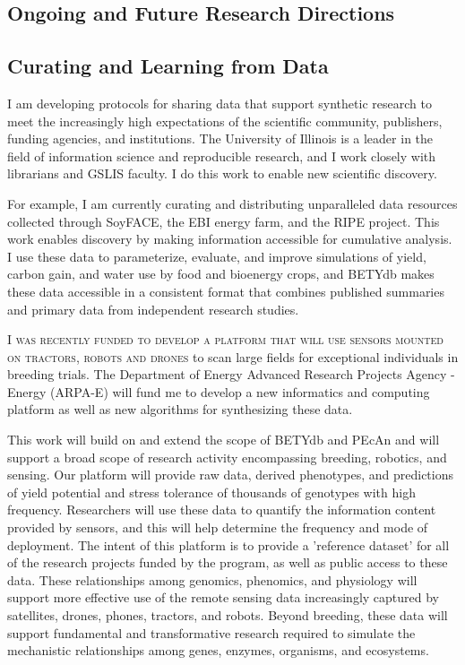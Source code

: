 \documentclass[english]{tufte-handout}
\providecommand\mynewthought[1]{%
   \addvspace{0.5em}%
   \noindent\hspace{-0.5em}\textsc{#1} %
}
\begin{document}
\begin{fullwidth}
\section{Ongoing and Future Research Directions}


\subsection{Curating and Learning from Data} 

 I am developing protocols for sharing data that support synthetic research to meet the increasingly high expectations of the scientific community, publishers, funding agencies, and institutions.
 The University of Illinois is a leader in the field of information science and reproducible research, and I work closely with librarians and GSLIS faculty.
 I do this work to enable new scientific discovery.

 For example, I am currently curating and distributing unparalleled data resources collected through SoyFACE, the EBI energy farm, and the RIPE project.
 This work enables discovery by making information accessible for cumulative analysis.
 I use these data to parameterize, evaluate, and improve simulations of yield, carbon gain, and water use by food and bioenergy crops, and BETYdb makes these data accessible in a consistent format that combines published summaries and primary data from independent research studies.

\mynewthought{I was recently funded to develop a platform that will use sensors mounted on tractors, robots and drones} to scan large fields for exceptional individuals in breeding trials.
 The Department of Energy Advanced Research Projects Agency - Energy (ARPA-E) will fund me to develop a new informatics and computing platform as well as new algorithms for synthesizing these data.

This work will build on and extend the scope of BETYdb and PEcAn and will support a broad scope of research activity encompassing breeding, robotics, and sensing.
Our platform will provide raw data, derived phenotypes, and predictions of yield potential and stress tolerance of thousands of genotypes with high frequency.
 Researchers will use these data to quantify the information content provided by sensors, and this will help determine the frequency and mode of deployment.
 The intent of this platform is to provide a 'reference dataset' for all of the research projects funded by the program, as well as public access to these data.
 These relationships among genomics, phenomics, and physiology will support more effective use of the remote sensing data increasingly captured by satellites, drones, phones, tractors, and robots.
 Beyond breeding, these data will support fundamental and transformative research required to simulate the mechanistic relationships among genes, enzymes, organisms, and ecosystems.
 



\end{fullwidth}
\end{document}
